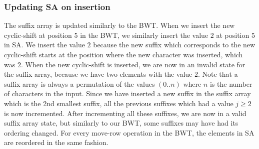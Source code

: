 \subsubsection{Updating SA on insertion}

The suffix array is updated similarly to the BWT. When we insert the new cyclic-shift at
position $5$ in the BWT, we similarly insert the value $2$ at position $5$ in SA. We
insert the value $2$ because the new suffix which corresponds to the new cyclic-shift
starts at the position where the new character was inserted, which was $2$. When the new
cyclic-shift is inserted, we are now in an invalid state for the suffix array, because we
have two elements with the value $2$. Note that a suffix array is always a permutation of
the values $(0..n)$ where $n$ is the number of characters in the input. Since we have
inserted a new suffix in the suffix array which is the 2nd smallest suffix, all the
previous suffixes which had a value $j \geq 2$ is now incremented. After incrementing all
these suffixes, we are now in a valid suffix array state, but similarly to our BWT, some
suffixes may have had its ordering changed. For every move-row operation in the BWT, the
elements in SA are reordered in the same fashion.

